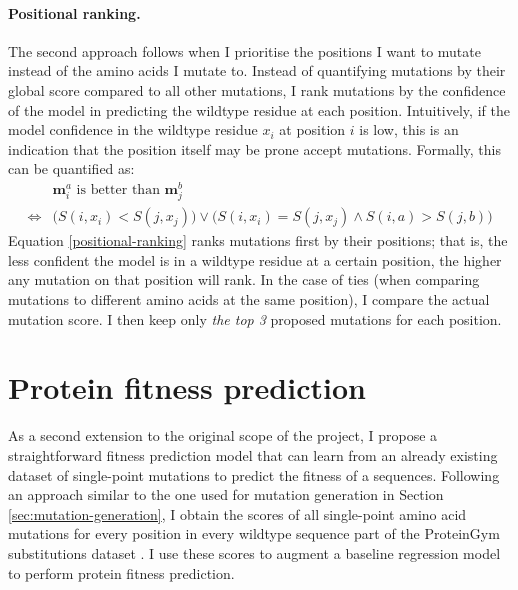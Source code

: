 \paragraph{Positional ranking.} The second approach follows when I prioritise the positions I want to mutate instead of the amino acids I mutate to. Instead of quantifying mutations by their global score compared to all other mutations, I rank mutations by the confidence of the model in predicting the wildtype residue at each position. Intuitively, if the model confidence in the wildtype residue $x_i$ at position $i$ is low, this is an indication that the position itself may be prone accept mutations. Formally, this can be quantified as:
\begin{equation}
\begin{aligned}
&\mathbf{m}_{i}^a\text{ is better than }\mathbf{m}_{j}^b \\ 
\iff &\Big(S(i, x_i) < S(j, x_j)\Big) \lor \Big(S(i, x_i) = S(j, x_j) \land S(i, a) > S(j, b)\Big)
\end{aligned}
\label{positional-ranking}
\end{equation}
Equation \ref{positional-ranking} ranks mutations first by their positions; that is, the less confident the model is in a wildtype residue at a certain position, the higher any mutation on that position will rank. In the case of ties (when comparing mutations to different amino acids at the same position), I compare the actual mutation score. I then keep only \textit{the top 3} proposed mutations for each position. 

\section{Protein fitness prediction}
\label{protein-fitness-prediction}
As a second extension to the original scope of the project, I propose a straightforward fitness prediction model that can learn from an already existing dataset of single-point mutations to predict the fitness of a sequences. Following an approach similar to the one used for mutation generation in Section \ref{sec:mutation-generation}, I obtain the scores of all single-point amino acid mutations for every position in every wildtype sequence part of the ProteinGym substitutions dataset \cite{tranception}. I use these scores to augment a baseline regression model to perform protein fitness prediction.


